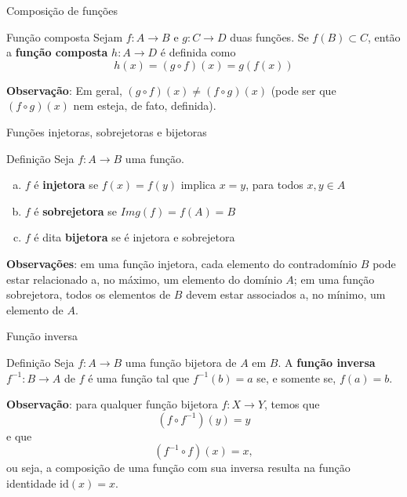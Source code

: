 \begin{frame}[fragile]{Composição de funções}

    \begin{block}{Função composta}
        Sejam $f: A\to B$ e $g: C\to D$ duas funções. Se $f(B)\subset C$, então a \textbf{função
            composta} $h: A\to D$ é definida como
        \[
            h(x) = (g\circ f)(x) = g(f(x))
        \]
    \end{block}

    \vspace{0.2in}

    \textbf{Observação}: Em geral, $(g\circ f)(x) \neq (f\circ g)(x)$ (pode ser que $(f\circ g)(x)$
        nem esteja, de fato, definida).

\end{frame}

\begin{frame}[fragile]{Funções injetoras, sobrejetoras e bijetoras}

    \begin{block}{Definição}
        Seja $f:A\to B$ uma função.
        \begin{enumerate}[(a)]
            \item $f$ é \textbf{injetora} se $f(x) = f(y)$ implica $x = y$, para todos $x, y\in A$
            \item $f$ é \textbf{sobrejetora} se $Img(f) = f(A) = B$
            \item $f$ é dita \textbf{bijetora} se é injetora e sobrejetora
        \end{enumerate}
    \end{block}

    \vspace{0.1in}
    
    \textbf{Observações}: em uma função injetora, cada elemento do contradomínio $B$ pode estar
        relacionado a, no máximo, um elemento do domínio $A$; em uma função sobrejetora, todos
        os elementos de $B$ devem estar associados a, no mínimo, um elemento de $A$.
\end{frame}

\begin{frame}[fragile]{Função inversa}

    \begin{block}{Definição}
        Seja $f:A\to B$ uma função bijetora de $A$ em $B$. A \textbf{função inversa} 
        $f^{-1}: B\to A$ de $f$ é uma função tal que $f^{-1}(b) = a$ se, e somente se, $f(a) = b$. 
    \end{block}

    \vspace{0.2in}

    \textbf{Observação}: para qualquer função bijetora $f:X\to Y$, temos que
    \[
        (f\circ f^{-1})(y) = y
    \] e que
    \[
        (f^{-1}\circ f)(x) = x,
    \]
    ou seja, a composição de uma função com sua inversa resulta na função identidade 
    $\mathrm{id}(x) = x$.
\end{frame}
